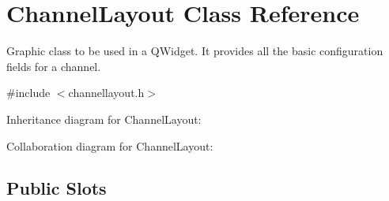 \hypertarget{classChannelLayout}{\section{Channel\+Layout Class Reference}
\label{classChannelLayout}
}


Graphic class to be used in a Q\+Widget. It provides all the basic configuration fields for a channel.  




{\ttfamily \#include $<$channellayout.\+h$>$}



Inheritance diagram for Channel\+Layout\+:


Collaboration diagram for Channel\+Layout\+:
\subsection*{Public Slots}
